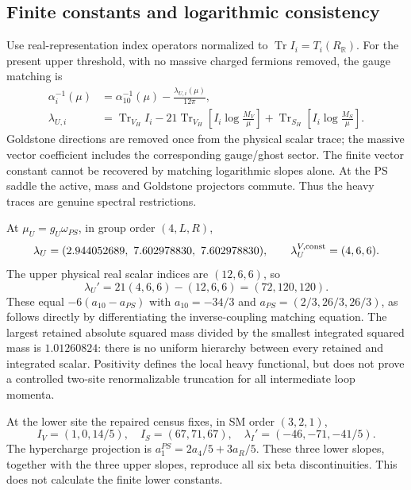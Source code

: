 \documentclass[11pt]{article}
\newcommand{\tr}{\operatorname{Tr}}
\begin{document}
\subsection{Finite constants and logarithmic consistency}
Use real-representation index operators normalized to
$\tr I_i=T_i(R_{\mathbb R})$. For the present upper threshold, with no
massive charged fermions removed, the gauge matching is \cite{Hall}
\begin{align}
 \alpha_i^{-1}(\mu)&=\alpha_{10}^{-1}(\mu)-\frac{\lambda_{U,i}(\mu)}{12\pi},\\
 \lambda_{U,i}&=\tr_{V_H} I_i
 -21\tr_{V_H}\!\left[I_i\log\frac{M_V}{\mu}\right]
 +\tr_{S_H}\!\left[I_i\log\frac{M_S}{\mu}\right].
\label{eq:finiteGauge}
\end{align}
Goldstone directions are removed once from the physical scalar trace; the
massive vector coefficient includes the corresponding gauge/ghost sector.
The finite vector constant cannot be recovered by matching logarithmic
slopes alone. At the PS saddle the active, mass and Goldstone projectors
commute. Thus the heavy traces are genuine spectral restrictions.

At $\mu_U=g_U\omega_{PS}$, in group order $(4,L,R)$,
\begin{equation}
 \lambda_U=(2.944052689,\ 7.602978830,\ 7.602978830),
 \qquad \lambda_U^{V,\rm const}=(4,6,6).
\end{equation}
The upper physical real scalar indices are $(12,6,6)$, so
\begin{equation}
 \lambda_U'=21(4,6,6)-(12,6,6)=(72,120,120).
\end{equation}
These equal $-6(a_{10}-a_{PS})$ with
$a_{10}=-34/3$ and $a_{PS}=(2/3,26/3,26/3)$, as follows directly by
differentiating the inverse-coupling matching equation.
The largest retained absolute squared mass divided by the smallest
integrated squared mass is $1.01260824$: there is no uniform hierarchy
between every retained and integrated scalar. Positivity defines the local
heavy functional, but does not prove a controlled two-site renormalizable
truncation for all intermediate loop momenta.

At the lower site the repaired census fixes, in SM order $(3,2,1)$,
\begin{equation}
 I_V=(1,0,14/5),\quad I_S=(67,71,67),\quad
 \lambda_I'=(-46,-71,-41/5).
\end{equation}
The hypercharge projection is
$a_1^{PS}=2a_4/5+3a_R/5$. These three lower slopes, together with the three
upper slopes, reproduce all six beta discontinuities. This does not
calculate the finite lower constants.
\end{document}
